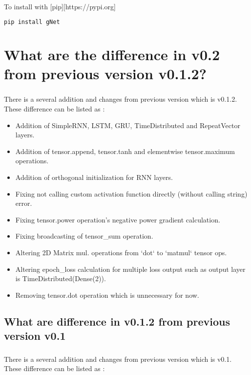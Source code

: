 \documentclass[12pt]{report}
\begin{document}
To install with [pip][https://pypi.org]
\begin{lstlisting}[language=bash, numbers=none, caption={Install with pip}, label={ex:install}]
pip install gNet
\end{lstlisting}



\chapter{What are the difference in v0.2 from previous version v0.1.2?}

\paragraph{}
There is a several addition and changes from previous version which is v0.1.2. These difference can be listed as :

\begin{itemize}
	\item Addition of SimpleRNN, LSTM, GRU, TimeDistributed and RepeatVector layers.
	\item Addition of tensor.append, tensor.tanh and elementwise tensor.maximum operations.
	\item Addition of orthogonal initialization for RNN layers.
	\item Fixing not calling custom activation function directly (without calling string) error.
	\item Fixing tensor.power operation's negative power gradient calculation.
	\item Fixing broadcasting of tensor\_sum operation.
	\item Altering 2D Matrix mul. operations from `dot` to `matmul` tensor ops.
	\item Altering epoch\_loss calculation for multiple loss output such as output layer is TimeDistributed(Dense(2)).
	\item Removing tensor.dot operation which is unnecessary for now.
\end{itemize}


\section{What are difference in v0.1.2 from previous version v0.1}
\paragraph{}
There is a several addition and changes from previous version which is v0.1. These difference can be listed as :
\end{document}
